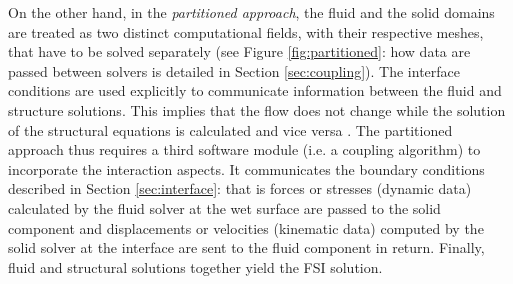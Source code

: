On the other hand, in the \textit{partitioned approach}, the fluid and the solid domains are treated as two distinct computational fields, with their respective meshes, that have to be solved separately (see Figure \ref{fig:partitioned}: how data are passed between solvers is detailed in Section \ref{sec:coupling}). The interface conditions are used explicitly to communicate information between the fluid and structure solutions. This implies that the flow does not change while the solution of the structural equations is calculated and vice versa \cite{degroote2009performance}. The partitioned approach thus requires a third software module (i.e. a coupling algorithm) to incorporate the interaction aspects. It communicates the boundary conditions described in Section \ref{sec:interface}: that is forces or stresses (dynamic data) calculated by the fluid solver at the wet surface are passed to the solid component and displacements or velocities (kinematic data) computed by the solid solver at the interface are sent to the fluid component in return. Finally, fluid and structural solutions together yield the FSI solution.

